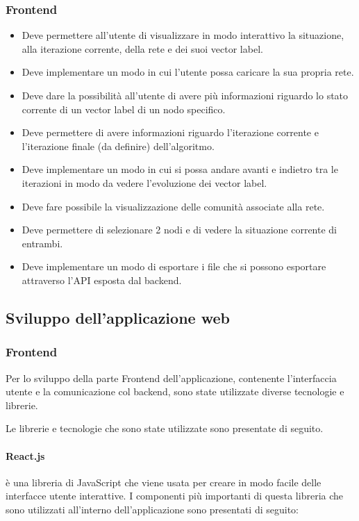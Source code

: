 \documentclass[a4paper,12pt]{report}
\begin{document}
			\subsubsection{Frontend}
				\begin{itemize}
					\item Deve permettere all'utente di visualizzare in modo interattivo la situazione, alla iterazione corrente, della rete e dei suoi vector label.
					\item Deve implementare un modo in cui l'utente possa caricare la sua propria rete.
					\item Deve dare la possibilità all'utente di avere più informazioni riguardo lo stato corrente di un vector label di un nodo specifico.
					\item Deve permettere di avere informazioni riguardo l'iterazione corrente e l'iterazione finale (da definire) dell'algoritmo.
					\item Deve implementare un modo in cui si possa andare avanti e indietro tra le iterazioni in modo da vedere l'evoluzione dei vector label.
					\item Deve fare possibile la visualizzazione delle comunità associate alla rete.
					\item Deve permettere di selezionare 2 nodi e di vedere la situazione corrente di entrambi.
					\item Deve implementare un modo di esportare i file che si possono esportare attraverso l'API esposta dal backend.
				\end{itemize}

		\subsection{Sviluppo dell'applicazione web}

			\subsubsection{Frontend}
			Per lo sviluppo della parte Frontend dell'applicazione, contenente l'interfaccia utente e la comunicazione col backend, sono state utilizzate diverse tecnologie e librerie. \par
			Le librerie e tecnologie che sono state utilizzate sono presentate di seguito.

			\paragraph*{React.js} \par è una libreria di JavaScript che viene usata per creare in modo facile delle interfacce utente interattive. 
				I componenti più importanti di questa libreria che sono utilizzati all'interno dell'applicazione sono presentati di seguito:
				
\end{document}
